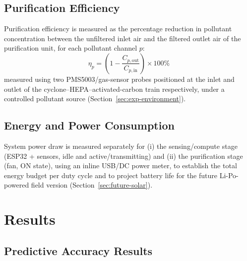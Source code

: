 \subsection{Purification Efficiency}
Purification efficiency is measured as the percentage reduction in pollutant concentration between the unfiltered inlet air and the filtered outlet air of the purification unit, for each pollutant channel $p$:
\begin{equation}
\eta_p = \left(1 - \frac{C_{p,\text{out}}}{C_{p,\text{in}}}\right) \times 100\%
\label{eq:purification-efficiency}
\end{equation}
measured using two PMS5003/gas-sensor probes positioned at the inlet and outlet of the cyclone--HEPA--activated-carbon train respectively, under a controlled pollutant source (Section~\ref{sec:exp-environment}).

\subsection{Energy and Power Consumption}
System power draw is measured separately for (i) the sensing/compute stage (ESP32 + sensors, idle and active/transmitting) and (ii) the purification stage (fan, ON state), using an inline USB/DC power meter, to establish the total energy budget per duty cycle and to project battery life for the future Li-Po-powered field version (Section~\ref{sec:future-solar}).

\section{Results}
\label{sec:exp-results}

\subsection{Predictive Accuracy Results}
\label{sec:exp-accuracy-result}

